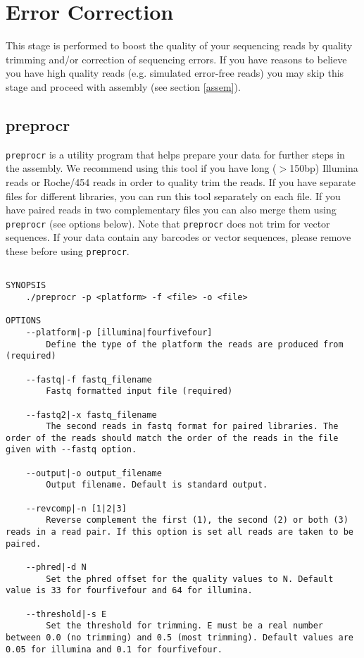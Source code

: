\documentclass[12pt,a4paper]{report}
\begin{document}
\section{Error Correction}
\label{ercor}

This stage is performed to boost the quality of your sequencing reads by quality trimming and/or correction of sequencing errors. If you have reasons to believe you have high quality reads (e.g. simulated error-free reads) you may skip this stage and proceed with assembly (see section \ref{assem}).

\subsection{preprocr}
\label{utils}

\texttt{preprocr} is a utility program that helps prepare your data for further steps in the assembly. We recommend using this tool if you have long ($>$150bp) Illumina reads or Roche/454 reads in order to quality trim the reads. If you have separate files for different libraries, you can run this tool separately on each file. If you have paired reads in two complementary files you can also merge them using \texttt{preprocr} (see options below). Note that \texttt{preprocr} does not trim for vector sequences. If your data contain any barcodes or vector sequences, please remove these before using \texttt{preprocr}.

\begin{lstlisting}

SYNOPSIS
    ./preprocr -p <platform> -f <file> -o <file> 

OPTIONS 
    --platform|-p [illumina|fourfivefour] 
        Define the type of the platform the reads are produced from (required) 

    --fastq|-f fastq_filename 
        Fastq formatted input file (required) 

    --fastq2|-x fastq_filename 
        The second reads in fastq format for paired libraries. The order of the reads should match the order of the reads in the file given with --fastq option. 

    --output|-o output_filename 
        Output filename. Default is standard output. 

    --revcomp|-n [1|2|3] 
        Reverse complement the first (1), the second (2) or both (3) reads in a read pair. If this option is set all reads are taken to be paired. 

    --phred|-d N 
        Set the phred offset for the quality values to N. Default value is 33 for fourfivefour and 64 for illumina. 

    --threshold|-s E 
        Set the threshold for trimming. E must be a real number between 0.0 (no trimming) and 0.5 (most trimming). Default values are 0.05 for illumina and 0.1 for fourfivefour. 

\end{lstlisting}
\end{document}
